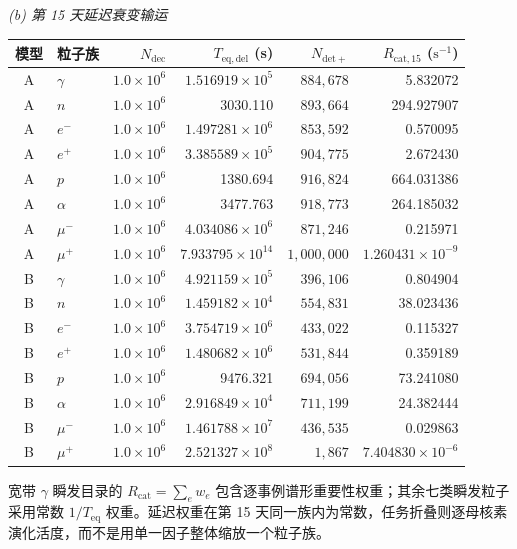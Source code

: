 \documentclass[11pt]{article}
\begin{document}
\begin{table}[!htbp]
\vspace{0.45em}
\noindent\textit{(b) 第 15 天延迟衰变输运}\par\vspace{0.20em}
\begin{tabular}{clrrrr}
\toprule
模型 & 粒子族 & $N_{\mathrm{dec}}$ & $T_{\mathrm{eq,del}}$ (s)
& $N_{\mathrm{det+}}$ & $R_{\mathrm{cat},15}$ ($\mathrm{s^{-1}}$) \\
\midrule
A & $\gamma$ & $1.0\times10^6$ & $1.516919\times10^5$ & $884{,}678$ & 5.832072 \\
A & $n$ & $1.0\times10^6$ & 3030.110 & $893{,}664$ & 294.927907 \\
A & $e^-$ & $1.0\times10^6$ & $1.497281\times10^6$ & $853{,}592$ & 0.570095 \\
A & $e^+$ & $1.0\times10^6$ & $3.385589\times10^5$ & $904{,}775$ & 2.672430 \\
A & $p$ & $1.0\times10^6$ & 1380.694 & $916{,}824$ & 664.031386 \\
A & $\alpha$ & $1.0\times10^6$ & 3477.763 & $918{,}773$ & 264.185032 \\
A & $\mu^-$ & $1.0\times10^6$ & $4.034086\times10^6$ & $871{,}246$ & 0.215971 \\
A & $\mu^+$ & $1.0\times10^6$ & $7.933795\times10^{14}$ & $1{,}000{,}000$ & $1.260431\times10^{-9}$ \\
\addlinespace[0.25em]
B & $\gamma$ & $1.0\times10^6$ & $4.921159\times10^5$ & $396{,}106$ & 0.804904 \\
B & $n$ & $1.0\times10^6$ & $1.459182\times10^4$ & $554{,}831$ & 38.023436 \\
B & $e^-$ & $1.0\times10^6$ & $3.754719\times10^6$ & $433{,}022$ & 0.115327 \\
B & $e^+$ & $1.0\times10^6$ & $1.480682\times10^6$ & $531{,}844$ & 0.359189 \\
B & $p$ & $1.0\times10^6$ & 9476.321 & $694{,}056$ & 73.241080 \\
B & $\alpha$ & $1.0\times10^6$ & $2.916849\times10^4$ & $711{,}199$ & 24.382444 \\
B & $\mu^-$ & $1.0\times10^6$ & $1.461788\times10^7$ & $436{,}535$ & 0.029863 \\
B & $\mu^+$ & $1.0\times10^6$ & $2.521327\times10^8$ & $1{,}867$ & $7.404830\times10^{-6}$ \\
\bottomrule
\end{tabular}

\vspace{0.35em}
\parbox{0.97\linewidth}{\raggedright 宽带 $\gamma$ 瞬发目录的 $R_{\mathrm{cat}}=\sum_e w_e$ 包含逐事例谱形重要性权重；其余七类瞬发粒子采用常数 $1/T_{\mathrm{eq}}$ 权重。延迟权重在第 15 天同一族内为常数，任务折叠则逐母核素演化活度，而不是用单一因子整体缩放一个粒子族。}
\end{table}
\endgroup
\end{document}
